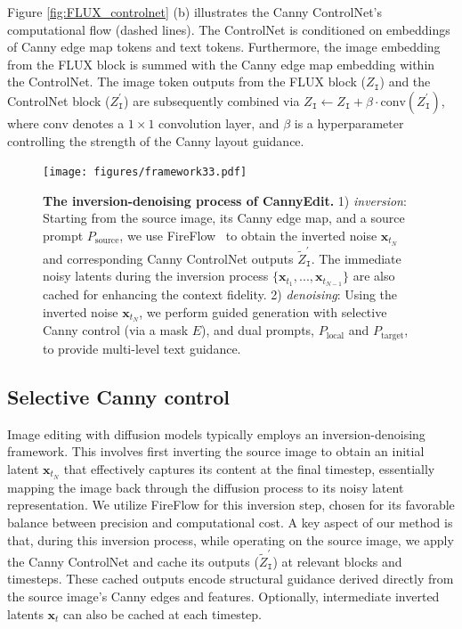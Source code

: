 \documentclass{article}
\begin{document}
Figure \ref{fig:FLUX_controlnet} (b) illustrates the Canny ControlNet's computational flow (dashed lines). The ControlNet is conditioned on embeddings of Canny edge map tokens and text tokens. Furthermore, the image embedding from the FLUX block is summed with the Canny edge map embedding within the ControlNet. The image token outputs from the FLUX block ($Z_{\texttt{I}}$) and the ControlNet block ($Z^{\prime}_{\texttt{I}}$) are subsequently combined via $Z_{\texttt{I}} \gets Z_{\texttt{I}} + \beta \cdot \mathrm{conv}(Z^{\prime}_{\texttt{I}})$,
where $\mathrm{conv}$ denotes a $1\times1$ convolution layer, and $\beta$ is a hyperparameter controlling the strength of the Canny layout guidance.


\begin{figure}[t]
    \centering
    \texttt{[image: figures/framework33.pdf]}
    \caption{\textbf{The inversion-denoising process of CannyEdit.} 1) \emph{inversion}: Starting from the source image, its Canny edge map, and a source prompt \( P_\text{source} \), we use FireFlow~\citep{deng2024fireflow} to obtain the inverted noise \( \mathbf{x}_{t_N} \) and corresponding Canny ControlNet outputs \( \tilde{Z}^{\prime}_{\texttt{I}} \). The immediate noisy latents during the inversion process $\{\mathbf{x}_{t_{1}},...,\mathbf{x}_{t_{N-1}}\}$ are also cached for enhancing the context fidelity. 2) \emph{denoising}: Using the inverted noise \( \mathbf{x}_{t_N} \), we perform guided generation with selective Canny control (via a mask $E$), and dual prompts, \( P_\text{local} \) and \( P_\text{target} \), to provide multi-level text guidance.}
    \label{fig:framework}
    \vspace{-2mm}
\end{figure}



\subsection{Selective Canny control}

Image editing with diffusion models typically employs an inversion-denoising framework. This involves first inverting the source image to obtain an initial latent $\mathbf{x}_{t_N}$ that effectively captures its content at the final timestep, essentially mapping the image back through the diffusion process to its noisy latent representation. We utilize FireFlow \citep{deng2024fireflow} for this inversion step, chosen for its favorable balance between precision and computational cost. A key aspect of our method is that, during this inversion process, while operating on the source image, we apply the Canny ControlNet and cache its outputs ($\tilde{Z}^{\prime}_{\texttt{I}}$) at relevant blocks and timesteps. These cached outputs encode structural guidance derived directly from the source image's Canny edges and features. Optionally, intermediate inverted latents $\mathbf{x}_t$ can also be cached at each timestep.
\end{document}
